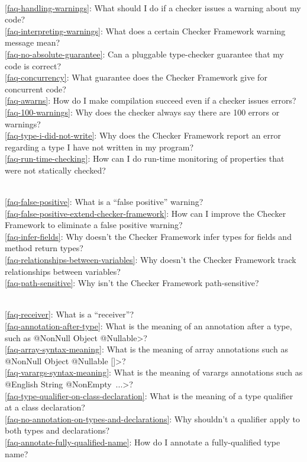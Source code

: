 \\ \ref{faq-handling-warnings}: What should I do if a checker issues a warning about my code?
\\ \ref{faq-interpreting-warnings}: What does a certain Checker Framework warning message mean?
\\ \ref{faq-no-absolute-guarantee}: Can a pluggable type-checker guarantee that my code is correct?
\\ \ref{faq-concurrency}: What guarantee does the Checker Framework give for concurrent code?
\\ \ref{faq-awarns}: How do I make compilation succeed even if a checker issues errors?
\\ \ref{faq-100-warnings}: Why does the checker always say there are 100 errors or warnings?
\\ \ref{faq-type-i-did-not-write}: Why does the Checker Framework report an error regarding a type I have not written in my program?
\\ \ref{faq-run-time-checking}: How can I do run-time monitoring of properties that were not statically checked?

\\ \ref{faq-false-positive}: What is a ``false positive'' warning?
\\ \ref{faq-false-positive-extend-checker-framework}: How can I improve the Checker Framework to eliminate a false positive warning?
\\ \ref{faq-infer-fields}: Why doesn't the Checker Framework infer types for fields and method return types?
\\ \ref{faq-relationships-between-variables}: Why doesn't the Checker Framework track relationships between variables?
\\ \ref{faq-path-sensitive}: Why isn't the Checker Framework path-sensitive?

\\ \ref{faq-receiver}: What is a ``receiver''?
\\ \ref{faq-annotation-after-type}: What is the meaning of an annotation after a type, such as \<@NonNull Object @Nullable>?
\\ \ref{faq-array-syntax-meaning}: What is the meaning of array annotations such as \<@NonNull Object @Nullable []>?
\\ \ref{faq-varargs-syntax-meaning}: What is the meaning of varargs annotations such as \<@English String @NonEmpty~...>?
\\ \ref{faq-type-qualifier-on-class-declaration}: What is the meaning of a type qualifier at a class declaration?
\\ \ref{faq-no-annotation-on-types-and-declarations}: Why shouldn't a qualifier apply to both types and declarations?
\\ \ref{faq-annotate-fully-qualified-name}: How do I annotate a
fully-qualified type name?

